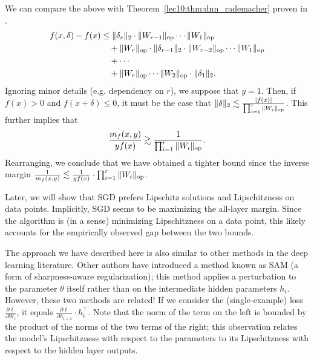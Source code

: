 \begin{remark}\label{remark:1}
We can compare the above with Theorem~\ref{lec10:thm:dnn_rademacher} proven in \cite{bartlett2017}.
\begin{equation}
\begin{split}
f(x, \delta) - f(x) &\leq \|\delta_r\|_2 \cdot \|W_{r-1}\|_{\text{op}} \cdots \|W_1\|_{\text{op}} \\
&\quad + \|W_r\|_{\text{op}} \cdot \|\delta_{r-1}\|_2 \cdot \|W_{r - 2}\|_{\text{op}} \cdots \|W_1\|_{\text{op}} \\
&\quad + \cdots  \\
&\quad + \|W_r\|_{\text{op}} \cdots \|W_2\|_{\text{op}} \cdot \|\delta_1\|_2.
\end{split}
\end{equation}
Ignoring minor details (e.g. dependency on $r$), we suppose that $y = 1$. Then, if $f(x) > 0$ and $f(x + \delta) \leq 0$, it must be the case that $\|\delta\|_2 \lesssim \frac{|f(x)|}{\prod_{i = 1}^r \|W_i\|_{\text{op}}}$. This further implies that 
\begin{align}
    \frac{m_f(x, y)}{y f(x)} \gtrsim \frac{1}{\prod_{i = 1}^r \|W_i\|_{\text{op}}}.
\end{align}
Rearranging, we conclude that we have obtained a tighter bound since the inverse margin $\frac{1}{m_f(x, y)} \lesssim \frac{1}{yf(x)} \cdot \prod_{i = 1}^r \|W_i\|_{\text{op}}$.
\end{remark}

\begin{remark}
Later, we will show that SGD prefers Lipschitz solutions and Lipschitzness on data points.
 Implicitly, SGD seems to be maximizing the all-layer margin. Since the algorithm is (in a sense) minimizing Lipschitzness on a data point, this likely accounts for the empirically observed gap between the two bounds. 
\end{remark}

\begin{remark}
The approach we have described here is also similar to other methods in the deep learning literature. Other authors have introduced a method known as SAM (a form of sharpness-aware regularization); this method applies a perturbation to the parameter $\theta$ itself rather than on the intermediate hidden parameters $h_i$. However, these two methods are related! If we consider the (single-example) loss $\frac{\partial \ell}{\partial W_i}$, it equals $\frac{\partial \ell}{\partial h_{i+1}} \cdot h_i^\top$. Note that the norm of the term on the left is bounded by the product of the norms of the two terms of the right; this observation relates the model's Lipschitzness with respect to the parameters to its Lipschitzness with respect to the hidden layer outputs.
\end{remark}

